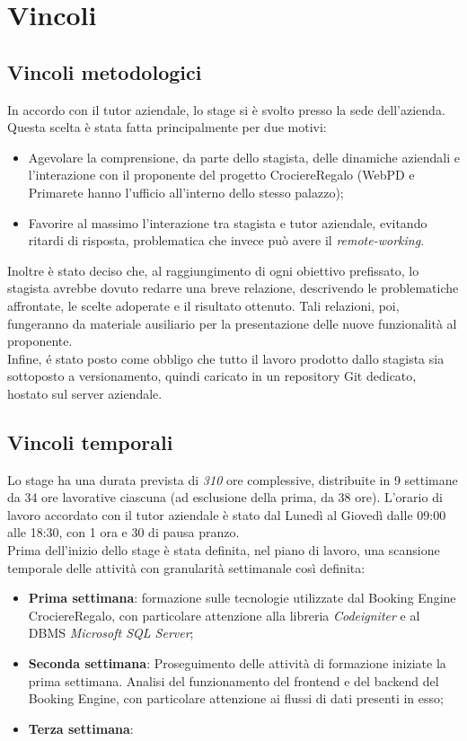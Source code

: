 \section{Vincoli}
\subsection{Vincoli metodologici}
In accordo con il tutor aziendale, lo stage si è svolto presso la sede dell'azienda. Questa scelta è stata fatta principalmente per due motivi:
\begin{itemize}
	\item Agevolare la comprensione, da parte dello stagista, delle dinamiche aziendali e l'interazione con il proponente del progetto CrociereRegalo (WebPD e Primarete hanno l'ufficio all'interno dello stesso palazzo);
	\item Favorire al massimo l'interazione tra stagista e tutor aziendale, evitando ritardi di risposta, problematica che invece può avere il \textit{remote-working}.
\end{itemize}
Inoltre è stato deciso che, al raggiungimento di ogni obiettivo prefissato, lo stagista avrebbe dovuto redarre una breve relazione, descrivendo le problematiche affrontate, le scelte adoperate e il risultato ottenuto. Tali relazioni, poi, fungeranno da materiale ausiliario per la presentazione delle nuove funzionalità al proponente.\\
Infine, é stato posto come obbligo che tutto il lavoro prodotto dallo stagista sia sottoposto a versionamento, quindi caricato in un repository Git dedicato, hostato sul server aziendale.

\subsection{Vincoli temporali}
Lo stage ha una durata prevista di \textit{310} ore complessive, distribuite in 9 settimane da 34 ore lavorative ciascuna (ad esclusione della prima, da 38 ore). L'orario di lavoro accordato con il tutor aziendale è stato dal Lunedì al Giovedì dalle 09:00 alle 18:30, con 1 ora e 30 di pausa pranzo. \\
Prima dell'inizio dello stage è stata definita, nel piano di lavoro, una scansione temporale delle attività con granularità settimanale così definita:
\begin{itemize}
	\item \textbf{Prima settimana}: formazione sulle tecnologie utilizzate dal Booking Engine CrociereRegalo, con particolare attenzione alla libreria \textit{Codeigniter} e al DBMS \textit{Microsoft SQL Server};
	\item \textbf{Seconda settimana}: Proseguimento delle attività di formazione iniziate la prima settimana. Analisi del funzionamento del frontend e del backend del Booking Engine, con particolare attenzione ai flussi di dati presenti in esso;
	\item \textbf{Terza settimana}: 
\end{itemize}